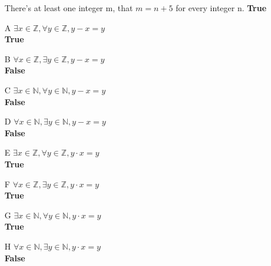 \documentclass[12pt]{article}
\begin{document}
\begin{enumerate}
	There's at least one integer m, that $m=n+5$ for every integer n. \textbf{True}
    \item [A] $\exists x \in \mathbb{Z}, \forall y \in \mathbb{Z}, y -x=y$\\
	\textbf{True}
    \item [B] $\forall x \in \mathbb{Z}, \exists y \in \mathbb{Z}, y -x=y$\\
	\textbf{False}
    \item [C] $\exists x \in \mathbb{N}, \forall y \in \mathbb{N}, y-x=y$\\
	\textbf{False}
    \item [D] $\forall x \in \mathbb{N}, \exists y \in \mathbb{N}, y-x=y$\\
	\textbf{False}
    \item [E] $\exists x \in \mathbb{Z}, \forall y \in \mathbb{Z}, y\cdot x = y$\\
	\textbf{True}
    \item [F] $\forall x \in \mathbb{Z}, \exists y \in \mathbb{Z}, y \cdot x =y$\\
	\textbf{True}
    \item [G] $\exists x \in \mathbb{N}, \forall y \in \mathbb{N}, y\cdot x = y$\\
	\textbf{True}
    \item [H] $\forall x \in \mathbb{N}, \exists y \in \mathbb{N}, y\cdot x = y$\\
	\textbf{False}
\end{enumerate}
\end{document}
